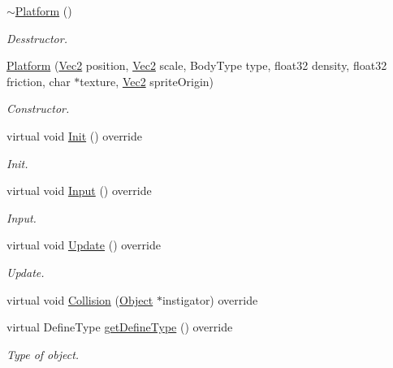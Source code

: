 \begin{DoxyCompactItemize}
\item 
\mbox{\label{class_platform_a13b5e4ef946b8a2fe38d22014145ab68}} 
\hyperlink{class_platform_a13b5e4ef946b8a2fe38d22014145ab68}{$\sim$\+Platform} ()
\begin{DoxyCompactList}\small\item\em Desstructor. \end{DoxyCompactList}\item 
\mbox{\label{class_platform_a183e85f66c60e8132fcc039b1d34f2c0}} 
\hyperlink{class_platform_a183e85f66c60e8132fcc039b1d34f2c0}{Platform} (\hyperlink{struct_vec2}{Vec2} position, \hyperlink{struct_vec2}{Vec2} scale, Body\+Type type, float32 density, float32 friction, char $\ast$texture, \hyperlink{struct_vec2}{Vec2} sprite\+Origin)
\begin{DoxyCompactList}\small\item\em Constructor. \end{DoxyCompactList}\item 
\mbox{\label{class_platform_a25f2e984268e9bf078749e84e7166e61}} 
virtual void \hyperlink{class_platform_a25f2e984268e9bf078749e84e7166e61}{Init} () override
\begin{DoxyCompactList}\small\item\em Init. \end{DoxyCompactList}\item 
\mbox{\label{class_platform_a4151ba122d6605f575364f4f5bdbf56a}} 
virtual void \hyperlink{class_platform_a4151ba122d6605f575364f4f5bdbf56a}{Input} () override
\begin{DoxyCompactList}\small\item\em Input. \end{DoxyCompactList}\item 
\mbox{\label{class_platform_a97a2696402d99af7f326ed1f238501c3}} 
virtual void \hyperlink{class_platform_a97a2696402d99af7f326ed1f238501c3}{Update} () override
\begin{DoxyCompactList}\small\item\em Update. \end{DoxyCompactList}\item 
virtual void \hyperlink{class_platform_abc610ede94941cb4c8423555f8faee13}{Collision} (\hyperlink{class_object}{Object} $\ast$instigator) override
\item 
\mbox{\label{class_platform_a4c4b277e82cf60185806779f7bdc01ab}} 
virtual Define\+Type \hyperlink{class_platform_a4c4b277e82cf60185806779f7bdc01ab}{get\+Define\+Type} () override
\begin{DoxyCompactList}\small\item\em Type of object. \end{DoxyCompactList}\end{DoxyCompactItemize}
